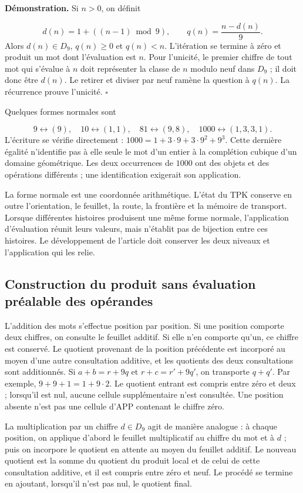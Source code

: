 \textbf{Démonstration.} Si $n>0$, on définit

\[
d(n)=1+((n-1)\bmod9),\qquad q(n)=\frac{n-d(n)}9.
\]
Alors $d(n)\in D_9$, $q(n)\ge0$ et $q(n)<n$. L’itération se termine à zéro et produit un mot dont l’évaluation est $n$. Pour l’unicité, le premier chiffre de tout mot qui s’évalue à $n$ doit représenter la classe de $n$ modulo neuf dans $D_9$ ; il doit donc être $d(n)$. Le retirer et diviser par neuf ramène la question à $q(n)$. La récurrence prouve l’unicité. \hfill\(\square\)

Quelques formes normales sont

\[
9\leftrightarrow(9),\quad
10\leftrightarrow(1,1),\quad
81\leftrightarrow(9,8),\quad
1000\leftrightarrow(1,3,3,1).
\]
L'écriture se vérifie directement : $1000=1+3\cdot9+3\cdot9^2+9^3$. Cette dernière égalité n'identifie pas à elle seule le mot d'un entier à la complétion cubique d'un domaine géométrique. Les deux occurrences de $1000$ ont des objets et des opérations différents ; une identification exigerait son application.

La forme normale est une coordonnée arithmétique. L'état du TPK conserve en outre l'orientation, le feuillet, la route, la frontière et la mémoire de transport. Lorsque différentes histoires produisent une même forme normale, l'application d'évaluation réunit leurs valeurs, mais n'établit pas de bijection entre ces histoires. Le développement de l'article doit conserver les deux niveaux et l'application qui les relie.

\subsection{Construction du produit sans évaluation préalable des opérandes}
L'addition des mots s'effectue position par position. Si une position comporte deux chiffres, on consulte le feuillet additif. Si elle n'en comporte qu'un, ce chiffre est conservé. Le quotient provenant de la position précédente est incorporé au moyen d'une autre consultation additive, et les quotients des deux consultations sont additionnés. Si \(a+b=r+9q\) et \(r+c=r'+9q'\), on transporte \(q+q'\). Par exemple, \(9+9+1=1+9\cdot2\). Le quotient entrant est compris entre zéro et deux ; lorsqu'il est nul, aucune cellule supplémentaire n'est consultée. Une position absente n'est pas une cellule d'APP contenant le chiffre zéro.

La multiplication par un chiffre $d\in D_9$ agit de manière analogue : à chaque position, on applique d’abord le feuillet multiplicatif au chiffre du mot et à $d$ ; puis on incorpore le quotient en attente au moyen du feuillet additif. Le nouveau quotient est la somme du quotient du produit local et de celui de cette consultation additive, et il est compris entre zéro et neuf. Le procédé se termine en ajoutant, lorsqu’il n’est pas nul, le quotient final.

